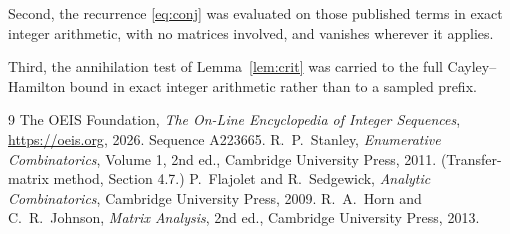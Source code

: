 \documentclass[11pt,a4paper]{article}
\theoremstyle{plain}
\theoremstyle{definition}
\begin{document}
Second, the recurrence \eqref{eq:conj} was evaluated on those published terms in exact
integer arithmetic, with no matrices involved, and vanishes wherever it applies.

Third, the annihilation test of Lemma~\ref{lem:crit} was carried to the full
Cayley--Hamilton bound in exact integer arithmetic rather than to a sampled prefix.

\begin{thebibliography}{9}
 The OEIS Foundation, \emph{The On-Line Encyclopedia of Integer
Sequences}, \url{https://oeis.org}, 2026. Sequence A223665.
 R.~P.~Stanley, \emph{Enumerative Combinatorics}, Volume 1, 2nd ed.,
Cambridge University Press, 2011. (Transfer-matrix method, Section 4.7.)
 P.~Flajolet and R.~Sedgewick, \emph{Analytic Combinatorics}, Cambridge
University Press, 2009.
 R.~A.~Horn and C.~R.~Johnson, \emph{Matrix Analysis}, 2nd ed., Cambridge
University Press, 2013.
\end{thebibliography}
\end{document}
